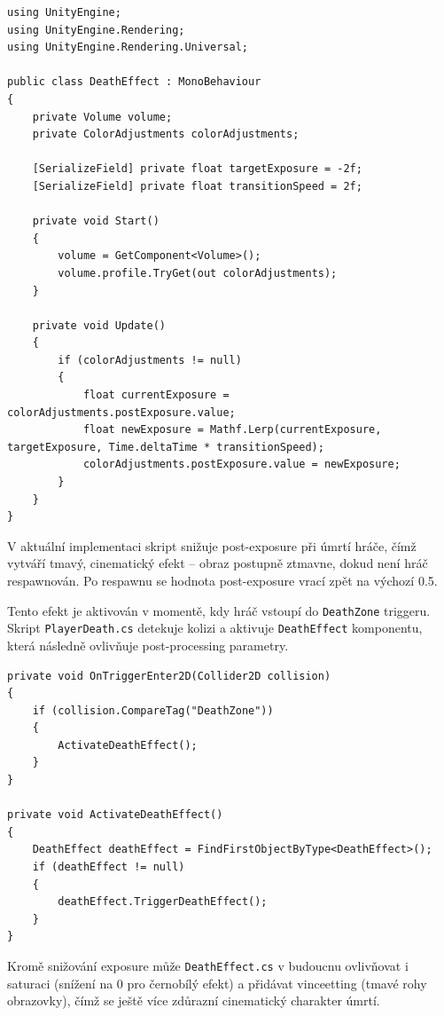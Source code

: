 \begin{lstlisting}[caption={DeathEffect.cs -- základní struktura}, label={lst:deatheffect}]
using UnityEngine;
using UnityEngine.Rendering;
using UnityEngine.Rendering.Universal;

public class DeathEffect : MonoBehaviour
{
    private Volume volume;
    private ColorAdjustments colorAdjustments;
    
    [SerializeField] private float targetExposure = -2f;
    [SerializeField] private float transitionSpeed = 2f;
    
    private void Start()
    {
        volume = GetComponent<Volume>();
        volume.profile.TryGet(out colorAdjustments);
    }
    
    private void Update()
    {
        if (colorAdjustments != null)
        {
            float currentExposure = colorAdjustments.postExposure.value;
            float newExposure = Mathf.Lerp(currentExposure, targetExposure, Time.deltaTime * transitionSpeed);
            colorAdjustments.postExposure.value = newExposure;
        }
    }
}
\end{lstlisting}

V aktuální implementaci skript snižuje post-exposure při úmrtí hráče, čímž vytváří tmavý, cinematický efekt -- obraz postupně ztmavne, dokud není hráč respawnován. Po respawnu se hodnota post-exposure vrací zpět na výchozí 0.5.

Tento efekt je aktivován v momentě, kdy hráč vstoupí do \texttt{DeathZone} triggeru. Skript \texttt{PlayerDeath.cs} detekuje kolizi a aktivuje \texttt{DeathEffect} komponentu, která následně ovlivňuje post-processing parametry.

\begin{lstlisting}[caption={PlayerDeath.cs -- aktivace Death Effectu}, label={lst:playerdeath-deatheffect}]
private void OnTriggerEnter2D(Collider2D collision)
{
    if (collision.CompareTag("DeathZone"))
    {
        ActivateDeathEffect();
    }
}

private void ActivateDeathEffect()
{
    DeathEffect deathEffect = FindFirstObjectByType<DeathEffect>();
    if (deathEffect != null)
    {
        deathEffect.TriggerDeathEffect();
    }
}
\end{lstlisting}

Kromě snižování exposure může \texttt{DeathEffect.cs} v budoucnu ovlivňovat i saturaci (snížení na 0 pro černobílý efekt) a přidávat vinceetting (tmavé rohy obrazovky), čímž se ještě více zdůrazní cinematický charakter úmrtí.

